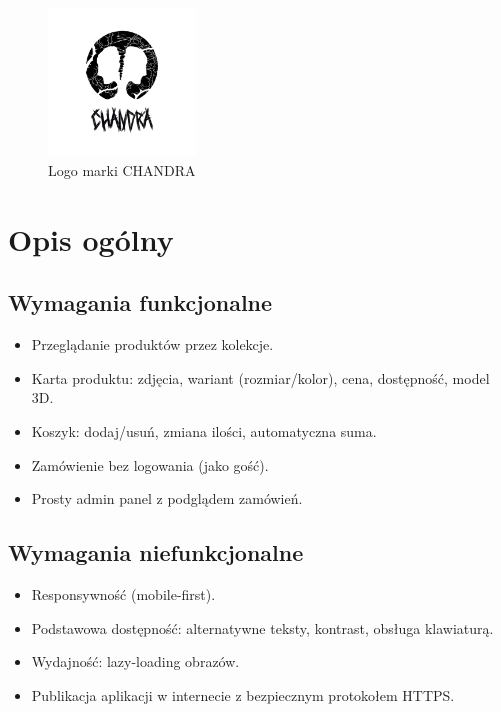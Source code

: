 \documentclass[14pt]{extarticle}
\begin{document}
		\begin{figure}[h]
			\centering
			\includegraphics[width=0.35\textwidth]{chandra-logo.png}
			\caption{Logo marki CHANDRA}
		\end{figure}

	\section{Opis ogólny}
		\subsection{Wymagania funkcjonalne}
		\begin{itemize}
			\item Przeglądanie produktów przez kolekcje.
			\item Karta produktu: zdjęcia, wariant (rozmiar/kolor), cena, dostępność, model 3D.
			\item Koszyk: dodaj/usuń, zmiana ilości, automatyczna suma.
			\item Zamówienie bez logowania (jako gość).
			\item Prosty admin panel z podglądem zamówień.
		\end{itemize}

		\subsection{Wymagania niefunkcjonalne}
		\begin{itemize}
			\item Responsywność (mobile-first).
			\item Podstawowa dostępność: alternatywne teksty, kontrast, obsługa klawiaturą.
			\item Wydajność: lazy-loading obrazów.
			\item Publikacja aplikacji w internecie z bezpiecznym protokołem HTTPS.
		\end{itemize}
		
\end{document}
